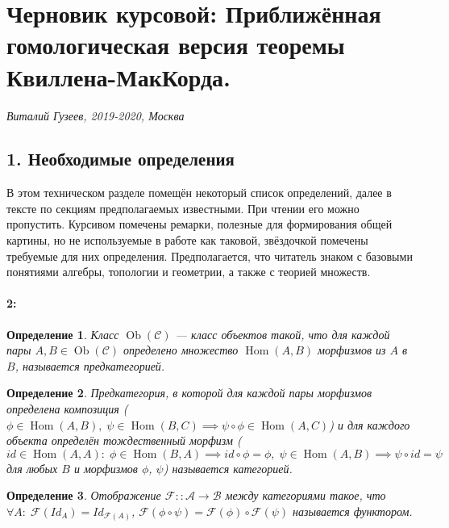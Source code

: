 \documentclass[a4paper,12pt]{report}
\newtheorem{definition}{Определение}
\begin{document}
	\section*{Черновик курсовой: Приближённая гомологическая версия теоремы Квиллена-МакКорда.}
  \textit{Виталий Гузеев, 2019-2020, Москва}

  \hrulefill

\subsection*{1. Необходимые определения}
В этом техническом разделе помещён некоторый список определений, далее в тексте по секциям предполагаемых известными. При чтении его можно пропустить. Курсивом помечены ремарки, полезные для формирования общей картины, но не используемые в работе как таковой, звёздочкой помечены требуемые для них определения. Предполагается, что читатель знаком с базовыми понятиями алгебры, топологии и геометрии, а также с теорией множеств.\\
\paragraph*{2:}

\begin{definition}
Класс $\operatorname{Ob}(\mathcal{C})$ --- класс объектов такой, что для каждой пары $A,B \in \operatorname{Ob}(\mathcal{C})$ определено множество $\operatorname{Hom}(A,B)$ морфизмов из $A$ в $B$, называется предкатегорией.
\end{definition}

\begin{definition}
Предкатегория, в которой для каждой пары морфизмов определена композиция ($\phi \in \operatorname{Hom}(A,B),\; \psi \in \operatorname{Hom}(B,C) \implies \psi \circ \phi \in \operatorname{Hom}(A,C)$) и для каждого объекта определён тождественный морфизм
($id \in \operatorname{Hom}(A,A):\; \phi \in \operatorname{Hom}(B,A) \implies id \circ \phi = \phi,\; \psi \in \operatorname{Hom}(A,B) \implies \psi \circ id = \psi$ для любых $B$ и морфизмов $\phi$, $\psi$) называется категорией.\\
\end{definition}

\begin{definition}
Отображение $\mathcal{F} :: \mathcal{A} \to \mathcal{B}$ между категориями такое, что $\forall A:\;\mathcal{F}(Id_A) = Id_{\mathcal{F}(A)}$,
$\mathcal{F}(\phi \circ \psi) = \mathcal{F}(\phi) \circ \mathcal{F}(\psi)$ называется функтором.
\end{definition}
\end{document}

